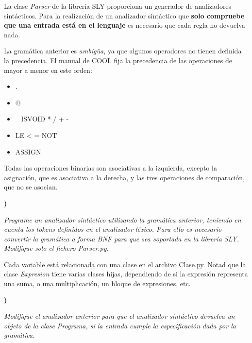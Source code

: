 \documentclass{article}
\newcounter{pregunta}
\newcommand\prop[1]%
{\addtocounter{pregunta}{1}
\noindent%
{\color{naranja_muy}\small\bf\thepregunta)}
\parbox[t]{.95\linewidth}{\it #1}}
\begin{document}
La clase \emph{Parser} de la librería SLY proporciona un generador de analizadores sintácticos. Para la realización de un analizador sintáctico que \textbf{solo compruebe que una entrada está en el lenguaje} es necesario que cada regla no devuelva nada.

La gramática anterior es \emph{ambigüa}, ya que algunos operadores no tienen definida la precedencia.
El manual de COOL fija la precedencia de las operaciones  de mayor a menor en este orden:
\begin{itemize}
\item .
\item @
\item ~ ISVOID * / + -
  
\item LE < = NOT
  
\item ASSIGN
\end{itemize}
Todas las operaciones binarias son asociativas a la izquierda, excepto la asignación, que es asociativa a la derecha, y las tres operaciones de comparación, que no se asocian.


\prop{ Programe un analizador sintáctico utilizando la gramática anterior, teniendo en cuenta los tokens definidos en el analizador léxico. Para ello es necesario convertir la gramática a forma BNF  para que sea soportada en la librería SLY. Modifique solo el fichero Parser.py.
}


Cada variable está relacionada con una clase en el archivo Clase.py. Notad que la clase \emph{Expresion} tiene varias clases hijas, dependiendo de si la expresión representa una suma, o una multiplicación, un bloque de expresiones, etc.

\prop{
  Modifique el analizador anterior para que el analizador sintáctico devuelva un objeto de la clase Programa, si la entrada cumple la especificación dada por la gramática.
}
\end{document}
